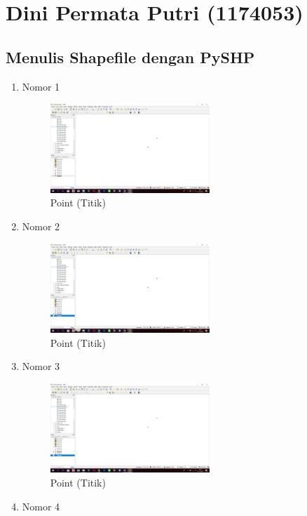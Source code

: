 \section{Dini Permata Putri (1174053)}
\subsection{Menulis Shapefile dengan PySHP}
\begin{enumerate}
	\item Nomor 1
	
	\begin{figure}[H]
		\includegraphics[width=6cm]{figures/Tugas2/1174053/No1.png}
		\centering
		\caption{Point (Titik)}
	\end{figure}
	\item Nomor 2
	
	\begin{figure}[H]
		\includegraphics[width=6cm]{figures/Tugas2/1174053/No2.png}
		\centering
		\caption{Point (Titik)}
	\end{figure}
	\item Nomor 3
	
	\begin{figure}[H]
		\includegraphics[width=6cm]{figures/Tugas2/1174053/No3.png}
		\centering
		\caption{Point (Titik)}
	\end{figure}
	\item Nomor 4
	

\end{enumerate}
